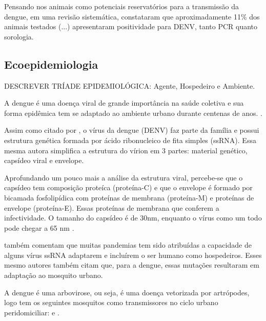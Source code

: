 
\indent Pensando nos animais como potenciais reservatórios para a transmissão da dengue,  em uma revisão sistemática, constataram que aproximadamente 11\% dos animais testados (...) apresentaram positividade para DENV, tanto PCR quanto sorologia.


\subsection{Ecoepidemiologia}

\indent DESCREVER TRÍADE EPIDEMIOLÓGICA: Agente, Hospedeiro e Ambiente.


\indent A dengue é uma doença viral de grande importância na saúde coletiva e sua forma epidêmica tem se adaptado ao ambiente urbano durante centenas de anos. \cite{ArboviralTransmission}.

\indent Assim como citado por , o vírus da dengue (\acrfull{DENV}) faz parte da família  e possui estrutura genética formada por ácido ribonucleico de fita simples (\acrfull{ssRNA}). Essa mesma autora simplifica a estrutura do vírion em 3 partes: material genético, capsídeo viral e envelope.

\indent Aprofundando um pouco mais a análise da estrutura viral, percebe-se que o capsídeo tem composição proteíca (proteína-C) e que o envelope é formado por bicamada fosfolipídica com proteínas de membrana (proteína-M) e proteínas de envelope (proteína-E). Essas proteínas de membrana que conferem a infectividade. O tamanho do capsídeo é de 30nm, enquanto o vírus como um todo pode chegar a 65 nm \cite{Fiocruz2010Atlas}. 

 também comentam que muitas pandemias tem sido atribuídas a capacidade de alguns vírus \acrshort{ssRNA} adaptarem e incluírem o ser humano como hospedeiros. Esses mesmo autores também citam que, para a dengue, essas mutações resultaram em adaptação ao mosquito urbano.

\indent A dengue é uma arbovirose, ou seja, é uma doença vetorizada por artrópodes, logo tem os seguintes mosquitos como transmissores no ciclo urbano peridomiciliar:  e  \cite{ArboviralTransmission}.

